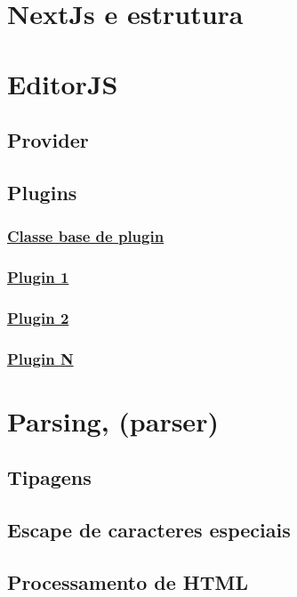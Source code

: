 \section{NextJs e estrutura}

\section{EditorJS}

\subsection{Provider}

\subsection{Plugins}

\subsubsection{\underline{Classe base de plugin}}

\subsubsection{\underline{Plugin 1}}

\subsubsection{\underline{Plugin 2}}

\subsubsection{\underline{Plugin N}}

\section{Parsing, (parser)}

\subsection{Tipagens}

\subsection{Escape de caracteres especiais}

\subsection{Processamento de HTML}